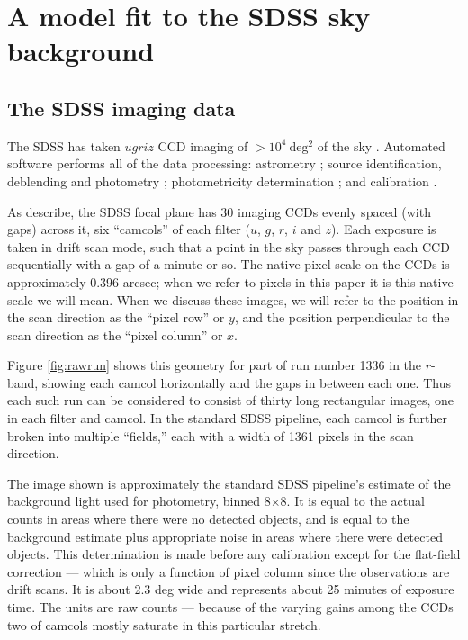 \documentclass[10pt,preprint]{aastex}
\begin{document}
\section{ A model fit to the SDSS sky background}
\label{sec:model}

\subsection{The SDSS imaging data}
\label{sec:data}

The SDSS has taken $ugriz$ CCD imaging of $>10^4~\mathrm{deg^2}$ of
the sky \citep{york00a,abazajian09a}.  Automated software performs all
of the data processing: astrometry \citep{pier03a}; source
identification, deblending and photometry \citep{lupton01a};
photometricity determination \citep{hogg01a}; and calibration
\citep{fukugita96a,smith02a, padmanabhan07b}.

As \citet{gunn05a} describe, the SDSS focal plane has 30 imaging CCDs
evenly spaced (with gaps) across it, six ``camcols'' of each filter
($u$, $g$, $r$, $i$ and $z$). Each exposure is taken in drift scan
mode, such that a point in the sky passes through each CCD
sequentially with a gap of a minute or so.  The native pixel scale on
the CCDs is approximately 0.396 arcsec; when we refer to pixels in
this paper it is this native scale we will mean. When we discuss these
images, we will refer to the position in the scan direction as the
``pixel row'' or $y$, and the position perpendicular to the scan
direction as the ``pixel column'' or $x$.

Figure \ref{fig:rawrun} shows this geometry for part of run number
1336 in the $r$-band, showing each camcol horizontally and the gaps in
between each one. Thus each such run can be considered to consist of
thirty long rectangular images, one in each filter and camcol. In the
standard SDSS pipeline, each camcol is further broken into multiple
``fields,'' each with a width of 1361 pixels in the scan direction.

The image shown is approximately the standard SDSS pipeline's estimate
of the background light used for photometry, binned 8$\times$8. It is
equal to the actual counts in areas where there were no detected
objects, and is equal to the background estimate plus appropriate
noise in areas where there were detected objects. This determination
is made before any calibration except for the flat-field correction
--- which is only a function of pixel column since the observations
are drift scans.  It is about 2.3 deg wide and represents about 25
minutes of exposure time. The units are raw counts --- because of the
varying gains among the CCDs two of camcols mostly saturate in this
particular stretch.
\end{document}
